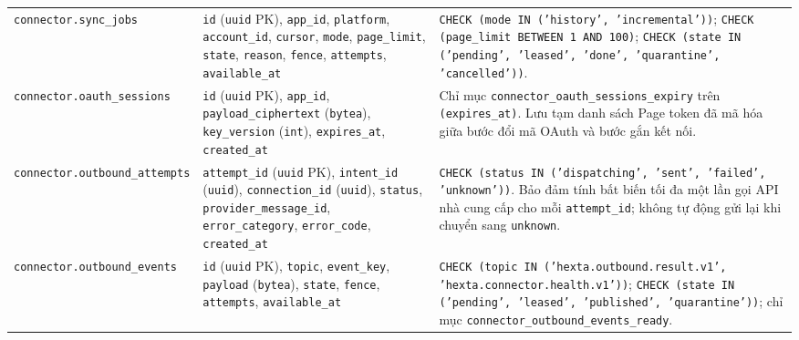 \begin{table}[htbp]
\begin{tabularx}{\linewidth}{@{}
    >{\raggedright\arraybackslash}p{3.4cm}
    >{\raggedright\arraybackslash}p{5.0cm}
    >{\raggedright\arraybackslash}X@{}}
    \texttt{connector.\hspace{0pt}sync\_jobs} &
    \texttt{id} (\texttt{uuid} PK), \texttt{app\_id}, \texttt{platform}, \texttt{account\_id}, \texttt{cursor}, \texttt{mode}, \texttt{page\_limit}, \texttt{state}, \texttt{reason}, \texttt{fence}, \texttt{attempts}, \texttt{available\_at} &
    \texttt{CHECK (mode IN ('history', 'incremental'))}; \texttt{CHECK (page\_limit BETWEEN 1 AND 100)}; \texttt{CHECK (state IN ('pending', 'leased', 'done', 'quarantine', 'cancelled'))}. \\
    \texttt{connector.\hspace{0pt}oauth\_sessions} &
    \texttt{id} (\texttt{uuid} PK), \texttt{app\_id}, \texttt{payload\_ciphertext} (\texttt{bytea}), \texttt{key\_version} (\texttt{int}), \texttt{expires\_at}, \texttt{created\_at} &
    Chỉ mục \texttt{connector\_\hspace{0pt}oauth\_\hspace{0pt}sessions\_\hspace{0pt}expiry} trên \texttt{(expires\_at)}. Lưu tạm danh sách Page token đã mã hóa giữa bước đổi mã OAuth và bước gắn kết nối. \\
    \texttt{connector.\hspace{0pt}outbound\_\hspace{0pt}attempts} &
    \texttt{attempt\_id} (\texttt{uuid} PK), \texttt{intent\_id} (\texttt{uuid}), \texttt{connection\_id} (\texttt{uuid}), \texttt{status}, \texttt{provider\_message\_id}, \texttt{error\_category}, \texttt{error\_code}, \texttt{created\_at} &
    \texttt{CHECK (status IN ('dispatching', 'sent', 'failed', 'unknown'))}. Bảo đảm tính bất biến tối đa một lần gọi API nhà cung cấp cho mỗi \texttt{attempt\_id}; không tự động gửi lại khi chuyển sang \texttt{unknown}. \\
    \texttt{connector.\hspace{0pt}outbound\_\hspace{0pt}events} &
    \texttt{id} (\texttt{uuid} PK), \texttt{topic}, \texttt{event\_key}, \texttt{payload} (\texttt{bytea}), \texttt{state}, \texttt{fence}, \texttt{attempts}, \texttt{available\_at} &
    \texttt{CHECK (topic IN ('hexta.\hspace{0pt}outbound.\hspace{0pt}result.\hspace{0pt}v1', 'hexta.\hspace{0pt}connector.\hspace{0pt}health.\hspace{0pt}v1'))}; \texttt{CHECK (state IN ('pending', 'leased', 'published', 'quarantine'))}; chỉ mục \texttt{connector\_\hspace{0pt}outbound\_\hspace{0pt}events\_\hspace{0pt}ready}. \\

\end{tabularx}
\end{table}
